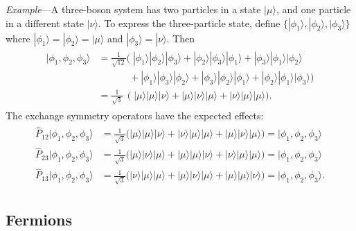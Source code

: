 \documentclass[pra,12pt]{revtex4}
\begin{document}
\begin{framed}
\noindent
\textit{Example}---A three-boson system has two particles in a state
$|\mu\rangle$, and one particle in a different state $|\nu\rangle$.
To express the three-particle state, define $\{|\phi_1\rangle,
|\phi_2\rangle, |\phi_3\rangle\}$ where $|\phi_1\rangle =
|\phi_2\rangle = |\mu\rangle$ and $|\phi_3\rangle = |\nu\rangle$.
Then
\begin{align}
  \begin{aligned}
    |\phi_1,\phi_2,\phi_3\rangle &= \frac{1}{\sqrt{12}} \Big( \;
    |\phi_1\rangle|\phi_2\rangle|\phi_3\rangle +
    |\phi_2\rangle|\phi_3\rangle|\phi_1\rangle +
    |\phi_3\rangle|\phi_1\rangle|\phi_2\rangle \\
    &\qquad\quad\, +
    |\phi_1\rangle|\phi_3\rangle|\phi_2\rangle +
    |\phi_3\rangle|\phi_2\rangle|\phi_1\rangle +
    |\phi_2\rangle|\phi_1\rangle|\phi_3\rangle\Big) \\
    &= \frac{1}{\sqrt{3}} \;\, \Big(\;
    |\mu\rangle|\mu\rangle|\nu\rangle +
    |\mu\rangle|\nu\rangle|\mu\rangle +
    |\nu\rangle|\mu\rangle|\mu\rangle\Big).
  \end{aligned}
\end{align}
The exchange symmetry operators have the expected effects:
\begin{align}
  \begin{aligned}
    \hat{P}_{12}|\phi_1,\phi_2,\phi_3\rangle
    &= \frac{1}{\sqrt{3}} \Big(
    |\mu\rangle|\mu\rangle|\nu\rangle +
    |\nu\rangle|\mu\rangle|\mu\rangle +
    |\mu\rangle|\nu\rangle|\mu\rangle\Big)
    = |\phi_1,\phi_2,\phi_3\rangle \\
    \hat{P}_{23}|\phi_1,\phi_2,\phi_3\rangle
    &= \frac{1}{\sqrt{3}} \Big(
    |\mu\rangle|\nu\rangle|\mu\rangle +
    |\mu\rangle|\mu\rangle|\nu\rangle +
    |\nu\rangle|\mu\rangle|\mu\rangle\Big)
    = |\phi_1,\phi_2,\phi_3\rangle\\
    \hat{P}_{13}|\phi_1,\phi_2,\phi_3\rangle
    &= \frac{1}{\sqrt{3}} \Big(
    |\nu\rangle|\mu\rangle|\mu\rangle +
    |\mu\rangle|\nu\rangle|\mu\rangle +
    |\mu\rangle|\mu\rangle|\nu\rangle\Big)
    = |\phi_1,\phi_2,\phi_3\rangle.
  \end{aligned}
\end{align}
\end{framed}

\subsection{Fermions}
\label{sec:fermions}
\end{document}
